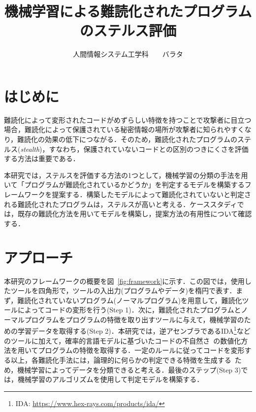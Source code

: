\documentclass[twocolumn,11pt]{jsarticle}
\title{機械学習による難読化されたプログラムのステルス評価}
\author{人間情報システム工学科\ \ \ \ バラタ}
\begin{document}
\twocolumn[\maketitle \vspace{1.5zw}]

\section{はじめに}

難読化によって変形されたコードがめずらしい特徴を持つことで攻撃者に目立つ場合，難読化によって保護されている秘密情報の場所が攻撃者に知られやすくなり，難読化の効果の低下につながる．そのため，難読化されたプログラムのステルス(\textit{stealth})，すなわち，保護されていないコードとの区別のつきにくさを評価する方法は重要である．

本研究では，ステルスを評価する方法の1つとして，機械学習の分類の手法を用いて「プログラムが難読化されているかどうか」を判定するモデルを構築するフレームワークを提案する．構築したモデルによって難読化されていないと判定される難読化されたプログラムは，ステルスが高いと考える．ケーススタディでは，既存の難読化方法を用いてモデルを構築し，提案方法の有用性について確認する．

\section{アプローチ}
本研究のフレームワークの概要を図~\ref{fig:framework}に示す．この図では，使用したツールを四角形で，ツールの入出力(プログラムやデータ)を楕円で表す．まず，難読化されていないプログラム(ノーマルプログラム)を用意して，難読化ツールによってコードの変形を行う(Step 1)．次に，難読化されたプログラムとノーマルプログラムをプログラムの特徴を取り出すツールに与えて，機械学習のための学習データを取得する(Step 2)．本研究では，逆アセンブラであるIDA\footnote{IDA: \url{https://www.hex-rays.com/products/ida/}}などのツールに加えて，確率的言語モデルに基づいたコードの不自然さ~\cite{code-art}の数値化方法を用いてプログラムの特徴を取得する．一定のルールに従ってコードを変形する以上，各難読化手法には，論理的に何らかの判定できる特徴を生成する~\cite{pinpoint}ため，機械学習によってデータを分類できると考える．最後のステップ(Step 3)では，機械学習のアルゴリズムを使用して判定モデルを構築する．
\end{document}
